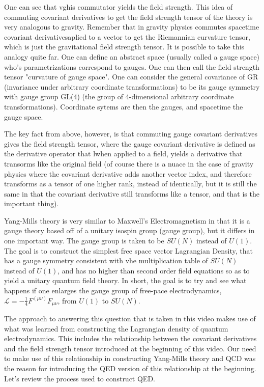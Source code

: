 \documentclass[a4]{article}
\begin{document}
    One can see that vghis commutator yields the field strength. This idea of commuting covariant derivatives to get
    the field strength tensor of the theory is very analogous to gravity. Remember that in gravity physics commutes
    spacetime covariant derivativesaplied to a vector to get the Riemannian curvature tensor, which is just the
    gravitational field strength tensor. It is possible to take this analogy quite far. One can define an abstract
    space (usually called a gauge space) who's parametrizations correspond to gauges. One can then call the field
    strength tensor "curvature of gauge space". One can consider the general covariance of GR (invariance under
    arbitrary coordinate transformations) to be its gauge symmetry with gauge group GL(4) (the group of
    4-dimensional arbitrary coordinate transformations). Coordinate sytems are then the gauges, and spacetime
    the gauge space. 

    The key fact from above, however, is that commuting gauge covariant derivatives gives the field strength tensor,
    where the gauge covariant derivative is defined as the derivative operator that lwhen applied to a field, yields
    a derivative that transorms like the original field (of course there is a nuace in the case of gravity physics
    where the covariant derivative adds another vector index, and therefore transforms as a tensor of one higher rank,
    instead of identically, but it is still the same in that the covariant derivative still transforms like a tensor,
    and that is the important thing).

    Yang-Mills theory is very similar to Maxwell's Electromagnetism in that it is a gauge theory based off of a unitary
    isospin group (gauge group), but it differs in one important way. The gauge group is taken to be $SU(N)$ instead of
    $U(1)$. The goal is to construct the simplest free space vector Lagrangian Density, that has a gauge symmetry
    consistent with vhe multiplication table of $SU(N)$ instead of $U(1)$, and has no higher than second order field
    equations so as to yield a unitary quantum field theory. In short, the goal is to try and see what happens if one
    enlarges the gauge group of free-pace electrodynamics, $\mathcal{L} = - \frac{1}{4} F^(\mu \nu) F_{\mu \nu}$, from
    $U(1)$ to $SU(N)$.

    The approach to answering this question that is taken in this video makes use of what was learned from constructing
    the Lagrangian density of quantum electrodynamics. This includes the relationship between the covariant derivatives
    and the field strength tensor introduced at the beginning of this video. Our need to make use of this relationship
    in constructing Yang-Mills theory and QCD was the reason for introducing the QED version of this relationship at the
    beginning. Let's review the process used to construct QED.
\end{document}
